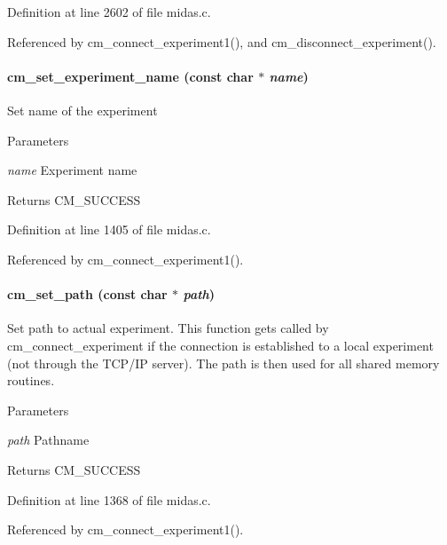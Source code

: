 Definition at line 2602 of file midas.c.

Referenced by cm\_\-connect\_\-experiment1(), and cm\_\-disconnect\_\-experiment().
\paragraph[{cm\_\-set\_\-experiment\_\-name}]{ cm\_\-set\_\-experiment\_\-name (const char $\ast$ {\em name})}\hfill\label{group__cmfunctionc_gafe97f63815e3eacedd504bca6b22032a}
Set name of the experiment 
\begin{DoxyParams}{Parameters}
\item[{\em name}]Experiment name \end{DoxyParams}
\begin{DoxyReturn}{Returns}
CM\_\-SUCCESS 
\end{DoxyReturn}


Definition at line 1405 of file midas.c.

Referenced by cm\_\-connect\_\-experiment1().
\paragraph[{cm\_\-set\_\-path}]{ cm\_\-set\_\-path (const char $\ast$ {\em path})}\hfill\label{group__cmfunctionc_ga006e27d46e2dd0eedde0a753f1b9ed67}
Set path to actual experiment. This function gets called by cm\_\-connect\_\-experiment if the connection is established to a local experiment (not through the TCP/IP server). The path is then used for all shared memory routines. 
\begin{DoxyParams}{Parameters}
\item[{\em path}]Pathname \end{DoxyParams}
\begin{DoxyReturn}{Returns}
CM\_\-SUCCESS 
\end{DoxyReturn}


Definition at line 1368 of file midas.c.

Referenced by cm\_\-connect\_\-experiment1().
